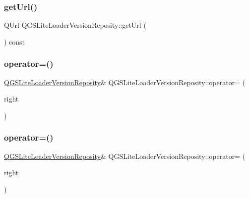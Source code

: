 \subsubsection{\texorpdfstring{get\+Url()}{getUrl()}}
{\footnotesize\ttfamily Q\+Url Q\+G\+S\+Lite\+Loader\+Version\+Reposity\+::get\+Url (\begin{DoxyParamCaption}{ }\end{DoxyParamCaption}) const}

\mbox{\label{class_q_g_s_lite_loader_version_reposity_a30c2620073ca47cc7aa54b94579c87e5}} 
\subsubsection{\texorpdfstring{operator=()}{operator=()}\hspace{0.1cm}{\footnotesize\ttfamily [1/2]}}
{\footnotesize\ttfamily \mbox{\hyperlink{class_q_g_s_lite_loader_version_reposity}{Q\+G\+S\+Lite\+Loader\+Version\+Reposity}}\& Q\+G\+S\+Lite\+Loader\+Version\+Reposity\+::operator= (\begin{DoxyParamCaption}\item[{const \mbox{\hyperlink{class_q_g_s_lite_loader_version_reposity}{Q\+G\+S\+Lite\+Loader\+Version\+Reposity}} \&}]{right }\end{DoxyParamCaption})\hspace{0.3cm}{\ttfamily [default]}}

\mbox{\label{class_q_g_s_lite_loader_version_reposity_a2ac18383a845d1bb59a0eb459855b65b}} 
\subsubsection{\texorpdfstring{operator=()}{operator=()}\hspace{0.1cm}{\footnotesize\ttfamily [2/2]}}
{\footnotesize\ttfamily \mbox{\hyperlink{class_q_g_s_lite_loader_version_reposity}{Q\+G\+S\+Lite\+Loader\+Version\+Reposity}}\& Q\+G\+S\+Lite\+Loader\+Version\+Reposity\+::operator= (\begin{DoxyParamCaption}\item[{\mbox{\hyperlink{class_q_g_s_lite_loader_version_reposity}{Q\+G\+S\+Lite\+Loader\+Version\+Reposity}} \&\&}]{right }\end{DoxyParamCaption})\hspace{0.3cm}{\ttfamily [default]}}

